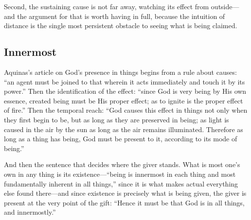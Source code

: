 Second, the sustaining cause is not far away, watching its effect from outside---and the argument for that is worth having in full, because the intuition of distance is the single most persistent obstacle to seeing what is being claimed.

\subsection{Innermost}

Aquinas's article on God's presence in things begins from a rule about causes: ``an agent must be joined to that wherein it acts immediately and touch it by its power.'' Then the identification of the effect: ``since God is very being by His own essence, created being must be His proper effect; as to ignite is the proper effect of fire.'' Then the temporal reach: ``God causes this effect in things not only when they first begin to be, but as long as they are preserved in being; as light is caused in the air by the sun as long as the air remains illuminated. Therefore as long as a thing has being, God must be present to it, according to its mode of being.''

And then the sentence that decides where the giver stands. What is most one's own in any thing is its existence---``being is innermost in each thing and most fundamentally inherent in all things,'' since it is what makes actual everything else found there---and since existence is precisely what is being given, the giver is present at the very point of the gift: ``Hence it must be that God is in all things, and innermostly.''

